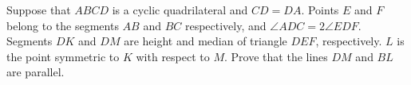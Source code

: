 Suppose that $ ABCD$ is a cyclic quadrilateral and $ CD=DA$. Points $ E$ and $ F$ belong to the segments $ AB$ and $ BC$ respectively, and $ \angle ADC=2\angle EDF$. Segments $ DK$ and $ DM$ are height and median of triangle $ DEF$,  respectively. $ L$ is the point symmetric to $ K$ with respect to $ M$. Prove that the lines $ DM$ and $ BL$ are parallel.
